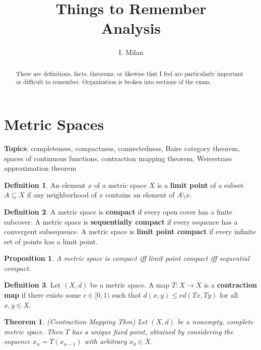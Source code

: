 \documentclass[11pt]{amsart}
\title{Things to Remember \\ Analysis}
\author{I. Milan}
\newtheorem*{theorem*}{Theorem}
\newtheorem*{proposition*}{Proposition}
\theoremstyle{definition}
\newtheorem*{definition*}{Definition}
\renewcommand\leq{\leqslant}
\renewcommand\:{\colon}
\begin{document}
\begin{abstract}
These are definitions, facts, theorems, or likewise that I feel are particularly important or difficult to remember. Organization is broken into sections of the exam.
\end{abstract}

\maketitle



\section{Metric Spaces}

\noindent \textbf{Topics}: completeness, compactness, connectedness, Baire category theorem, spaces of continuous functions, contraction mapping theorem, Weierstrass approximation theorem
\vskip40pt



\begin{definition*}
	An element $x$ of a metric space $X$ is a \textbf{limit point} of a subset $A \subseteq X$ if any neighborhood of $x$ contains an element of $A \setminus x$.
\end{definition*}

\begin{definition*}
	A metric space is \textbf{compact} if every open cover has a finite subcover. A metric space is \textbf{sequentially compact} if every sequence has a convergent subsequence. A metric space is \textbf{limit point compact} if every infinite set of points has a limit point.
\end{definition*}

\begin{proposition*}
	A metric space is compact iff limit point compact iff sequential compact.
\end{proposition*}

\begin{definition*}
	Let $(X, d)$ be a metric space. A map $T\: X \to X$ is a \textbf{contraction map} if there exists some $c \in [0,1)$ such that $d(x, y) \leq cd(Tx, Ty)$ for all $x, y \in X$.
\end{definition*}

\begin{theorem*}
	\textnormal{(Contraction Mapping Thm)} Let $(X, d)$ be a nonempty, complete metric space. Then $T$ has a unique fixed point, obtained by considering the sequence $x_n = T(x_{n-1})$ with arbitrary $x_0 \in X$.
\end{theorem*}
\end{document}
